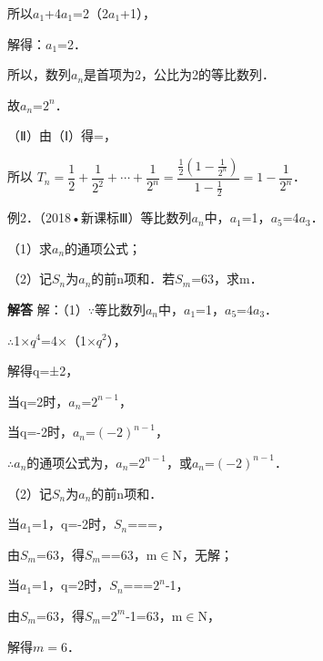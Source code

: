所以\ensuremath{a_{1}}+4\ensuremath{a_{1}}=2（2\ensuremath{a_{1}}+1），\par
解得：\ensuremath{a_{1}}=2．\par
所以，数列{\ensuremath{a_{n}}}是首项为2，公比为2的等比数列．\par
故\ensuremath{a_{n}}=\ensuremath{2^{n}}．\par
（Ⅱ）由（Ⅰ）得=，\par
所以 $T_n=\dfrac12+\dfrac1{2^2}+\cdots+\dfrac1{2^n}=\dfrac{\frac12\left(1-\frac1{2^n}\right)}{1-\frac12}=1-\dfrac1{2^n}$．\par
\par\endgroup\fi

例2．（2018•新课标Ⅲ）等比数列{\ensuremath{a_{n}}}中，\ensuremath{a_{1}}=1，\ensuremath{a_{5}}=4\ensuremath{a_{3}}．\par
（1）求{\ensuremath{a_{n}}}的通项公式；\par
（2）记\ensuremath{S_{n}}为{\ensuremath{a_{n}}}的前n项和．若\ensuremath{S_{m}}=63，求m．\par
\QuestionSpace{4.8cm}
\ifshowanswers
\par\begingroup\color{solutioncolor}\noindent\textbf{解答}\quad
解：（1）\ensuremath{\because}等比数列{\ensuremath{a_{n}}}中，\ensuremath{a_{1}}=1，\ensuremath{a_{5}}=4\ensuremath{a_{3}}．\par
\ensuremath{\therefore}1\ensuremath{\times}\ensuremath{q^{4}}=4\ensuremath{\times}（1\ensuremath{\times}\ensuremath{q^{2}}），\par
解得q=±2，\par
当q=2时，\ensuremath{a_{n}}=\ensuremath{2^{n-1}}，\par
当q=-2时，\ensuremath{a_{n}}=\ensuremath{(-2)^{n-1}}，\par
\ensuremath{\therefore}{\ensuremath{a_{n}}}的通项公式为，\ensuremath{a_{n}}=\ensuremath{2^{n-1}}，或\ensuremath{a_{n}}=\ensuremath{(-2)^{n-1}}．\par
（2）记\ensuremath{S_{n}}为{\ensuremath{a_{n}}}的前n项和．\par
当\ensuremath{a_{1}}=1，q=-2时，\ensuremath{S_{n}}===，\par
由\ensuremath{S_{m}}=63，得\ensuremath{S_{m}}==63，m\ensuremath{\in}N，无解；\par
当\ensuremath{a_{1}}=1，q=2时，\ensuremath{S_{n}}===\ensuremath{2^{n}}-1，\par
由\ensuremath{S_{m}}=63，得\ensuremath{S_{m}}=\ensuremath{2^{m}}-1=63，m\ensuremath{\in}N，\par
解得$m=6$．\par
\par\endgroup\fi

